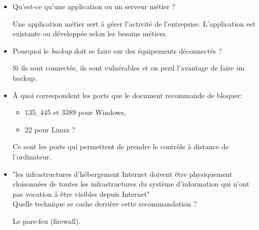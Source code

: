 \documentclass[a4paper]{article}
\begin{document}
\begin{itemize}
\item Qu’est-ce qu’une application ou un serveur métier ?
\begin{example}
    Une application métier sert à gérer l'activité de l'entreprise. L'application est existante ou développée selon les besoins métiers.
\end{example}





\item Pourquoi le \textit{backup} doit se faire sur des équipements déconnectés ?
\begin{example}
    Si ils sont connectés, ils sont vulnérables et on perd l'avantage de faire un backup.
\end{example}





\item À quoi correspondent les ports que le document recommande de bloquer:
\begin{itemize}
    \item 135, 445 et 3389 pour Windows,
    \item 22 pour Linux ?
\end{itemize}
\begin{example}
    Ce sont les ports qui permettent de prendre le contrôle à distance de l'ordinateur.
\end{example}





\item "les infrastructures d’hébergement Internet doivent être physiquement cloisonnées de toutes les infrastructures du système d’information qui n’ont pas vocation à être visibles depuis Internet" \\
Quelle technique se cache derrière cette recommandation ?
\begin{example}
    Le pare-feu (firewall).
\end{example}
\begin{center}
\end{center}
\end{itemize}
\end{document}
